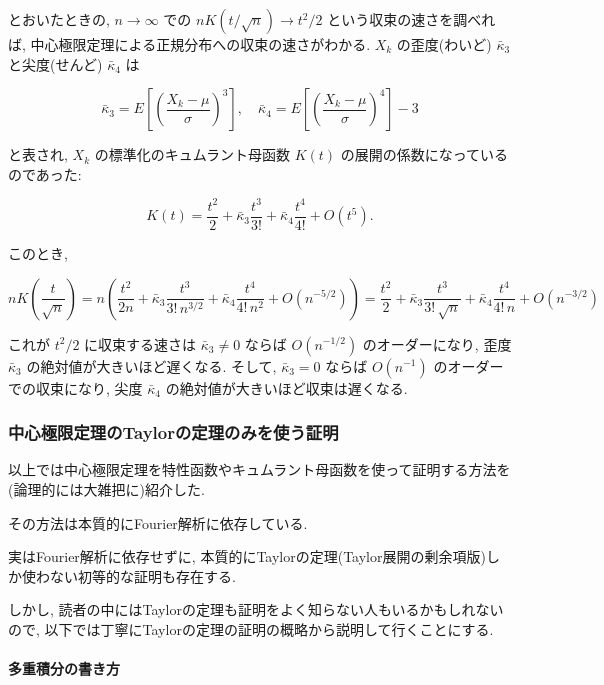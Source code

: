 \documentclass[10pt, a4paper,xelatex,ja=standard]{bxjsarticle}
\begin{document}
とおいたときの, \(n\to\infty\) での \(n K(t/\sqrt{n}) \to t^2/2\)
という収束の速さを調べれば,
中心極限定理による正規分布への収束の速さがわかる. \(X_k\) の歪度(わいど)
\(\bar\kappa_3\) と尖度(せんど) \(\bar\kappa_4\) は

\[
\bar\kappa_3 = E\left[\left(\frac{X_k - \mu}{\sigma}\right)^3\right], \quad
\bar\kappa_4 = E\left[\left(\frac{X_k - \mu}{\sigma}\right)^4\right] - 3
\]

と表され, \(X_k\) の標準化のキュムラント母函数 \(K(t)\)
の展開の係数になっているのであった:

\[
K(t) = \frac{t^2}{2} + \bar\kappa_3\frac{t^3}{3!} + \bar\kappa_4\frac{t^4}{4!} + O(t^5).
\]

このとき,

\[
n K\left(\frac{t}{\sqrt{n}}\right) =
n\left(
\frac{t^2}{2n} + \bar\kappa_3\frac{t^3}{3!\,n^{3/2}} + \bar\kappa_4\frac{t^4}{4!\,n^2} + O(n^{-5/2})
\right) =
\frac{t^2}{2} + \bar\kappa_3\frac{t^3}{3!\,\sqrt{n}} + \bar\kappa_4\frac{t^4}{4!\,n} + O(n^{-3/2})
\]

これが \(t^2/2\) に収束する速さは \(\bar\kappa_3 \ne 0\) ならば
\(O(n^{-1/2})\) のオーダーになり, 歪度 \(\bar\kappa_3\)
の絶対値が大きいほど遅くなる. そして, \(\bar\kappa_3 = 0\) ならば
\(O(n^{-1})\) のオーダーでの収束になり, 尖度 \(\bar\kappa_4\)
の絶対値が大きいほど収束は遅くなる.

    \hypertarget{ux4e2dux5fc3ux6975ux9650ux5b9aux7406ux306etaylorux306eux5b9aux7406ux306eux307fux3092ux4f7fux3046ux8a3cux660e}{%
\subsubsection{中心極限定理のTaylorの定理のみを使う証明}\label{ux4e2dux5fc3ux6975ux9650ux5b9aux7406ux306etaylorux306eux5b9aux7406ux306eux307fux3092ux4f7fux3046ux8a3cux660e}}

以上では中心極限定理を特性函数やキュムラント母函数を使って証明する方法を(論理的には大雑把に)紹介した.

その方法は本質的にFourier解析に依存している.

実はFourier解析に依存せずに,
本質的にTaylorの定理(Taylor展開の剰余項版)しか使わない初等的な証明も存在する.

しかし,
読者の中にはTaylorの定理も証明をよく知らない人もいるかもしれないので,
以下では丁寧にTaylorの定理の証明の概略から説明して行くことにする.

    \hypertarget{ux591aux91cdux7a4dux5206ux306eux66f8ux304dux65b9}{%
\paragraph{多重積分の書き方}\label{ux591aux91cdux7a4dux5206ux306eux66f8ux304dux65b9}}
\end{document}
